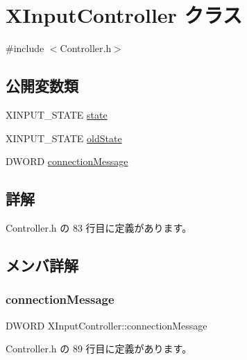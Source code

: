 \hypertarget{class_x_input_controller}{}\section{X\+Input\+Controller クラス}
\label{class_x_input_controller}


{\ttfamily \#include $<$Controller.\+h$>$}

\subsection*{公開変数類}
\begin{DoxyCompactItemize}
\item 
X\+I\+N\+P\+U\+T\+\_\+\+S\+T\+A\+TE \mbox{\hyperlink{class_x_input_controller_a36c0a2bb42c5559460653772a6ec26d1}{state}}
\item 
X\+I\+N\+P\+U\+T\+\_\+\+S\+T\+A\+TE \mbox{\hyperlink{class_x_input_controller_a686db9fe59e21e84e3cfcfbe15b518a2}{old\+State}}
\item 
D\+W\+O\+RD \mbox{\hyperlink{class_x_input_controller_a7d6ca73f305a34f74deabfeb1b342ae2}{connection\+Message}}
\end{DoxyCompactItemize}


\subsection{詳解}


 Controller.\+h の 83 行目に定義があります。



\subsection{メンバ詳解}
\mbox{\label{class_x_input_controller_a7d6ca73f305a34f74deabfeb1b342ae2}} 
\subsubsection{\texorpdfstring{connection\+Message}{connectionMessage}}
{\footnotesize\ttfamily D\+W\+O\+RD X\+Input\+Controller\+::connection\+Message}



 Controller.\+h の 89 行目に定義があります。

